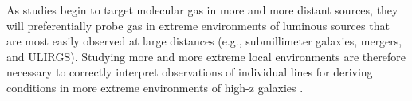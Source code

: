 \documentclass{article}
\begin{document}
As studies begin to target molecular gas in more and more distant sources, they will preferentially probe gas in extreme environments of luminous sources that are most easily observed at large distances (e.g., submillimeter galaxies, mergers, and ULIRGS). Studying more and more extreme local environments are therefore necessary to correctly interpret observations of individual lines for deriving conditions in more extreme environments of high-z galaxies \citep[e.g.,][]{Swinbank11}.
\end{document}
